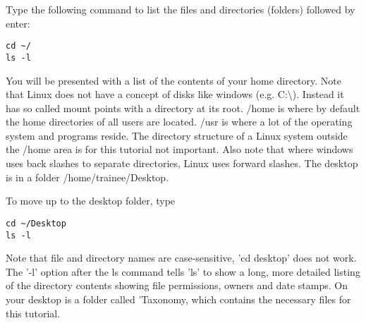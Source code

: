 \documentclass[a4paper,12pt,twoside]{memoir}
\begin{document}
\begin{steps}
Type the following command to list the files and directories (folders) followed by enter:

\begin{lstlisting}
cd ~/
ls -l
\end{lstlisting}
\end{steps}

\begin{note}
You will be presented with a list of the contents of your home directory. Note that Linux does not have a concept of disks like windows (e.g. C:\textbackslash{}). Instead it has so called mount points with a directory at its root. /home is where by default the home directories of all users are located. /usr is where a lot of the operating system and programs reside. The directory structure of a Linux system outside the /home area is for this tutorial not important. Also note that where windows uses back slashes to separate directories, Linux uses forward slashes. The desktop is in a folder /home/trainee/Desktop. 
\end{note}

\begin{steps}
To move up to the desktop folder, type

\begin{lstlisting}
cd ~/Desktop
ls -l
\end{lstlisting}
\end{steps}

\begin{note}
Note that file and directory names are case-sensitive, 'cd desktop' does not work. The '-l' option after the ls command tells 'ls' to show a long, more detailed listing of the directory contents showing file permissions, owners and date stamps. On your desktop is a folder called 'Taxonomy, which contains the necessary files for this tutorial. 
\end{note}
\end{document}

